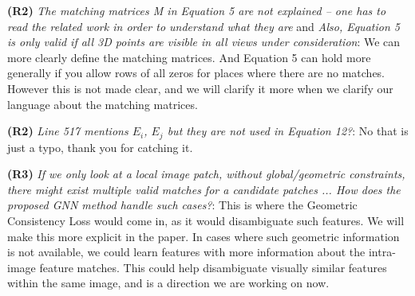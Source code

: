 \documentclass[10pt,twocolumn,letterpaper]{article}
\begin{document}
\textbf{(R2)} \textit{The matching matrices M in Equation 5 are not explained -- one has to read the related work in order to understand what they are} and \textit{Also, Equation 5 is only valid if all 3D points are visible in all views under consideration}:
We can more clearly define the matching matrices.
And Equation 5 can hold more generally if you allow rows of all zeros for places where there are no matches.
However this is not made clear, and we will clarify it more when we clarify our language about the matching matrices.

\textbf{(R2)} \textit{ Line 517 mentions $E_i$, $E_j$ but they are not used in Equation 12?}:
No that is just a typo, thank you for catching it.

\textbf{(R3)} \textit{If we only look at a local image patch, without global/geometric constraints, there might exist multiple valid matches for a candidate patches ... How does the proposed GNN method handle such cases?}:
This is where the Geometric Consistency Loss would come in, as it would disambiguate such features.
We will make this more explicit in the paper.
In cases where such geometric information is not available, we could learn features with more information about the intra-image feature matches.
This could help disambiguate visually similar features within the same image, and is a direction we are working on now.






{\tiny


}
\end{document}
